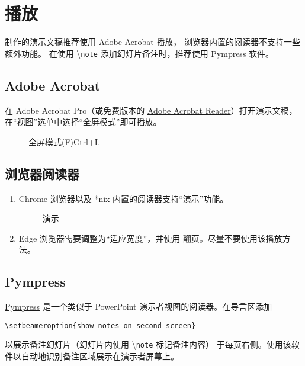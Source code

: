 \documentclass[
    UTF8,
    heading=true,
    12pt,
    a4paper
]{ctexrep}
\newcommand{\cmd}[1]{\textbackslash{}\texttt{#1}}
\begin{document}
\chapter{播放}

制作的演示文稿推荐使用 Adobe Acrobat 播放，
浏览器内置的阅读器不支持一些额外功能。
在使用 \cmd{note} 添加幻灯片备注时，推荐使用 Pympress 软件。

\section{Adobe Acrobat}

在 Adobe Acrobat Pro（或免费版本的
\href{https://www.adobe.com/cn/acrobat/pdf-reader.html}{Adobe Acrobat
Reader}）打开演示文稿，在“视图”选单中选择“全屏模式”即可播放。

\begin{figure}[h]
  \centering
  \begin{tcolorbox}[enhanced, title={视图(V)},
    attach boxed title to top left, boxed title
    style={sharp corners}, sharp corners, tile,
    width=6cm]
    \faTv{} 全屏模式(F)\hfill Ctrl+L
  \end{tcolorbox}
\end{figure}

\section{浏览器阅读器}

\begin{enumerate}
  \item[\faChrome] Chrome 浏览器以及 *nix
        内置的阅读器支持“演示”功能。
        \begin{figure}[h]
          \centering
          \begin{tcolorbox}[enhanced,
              title={$\vdots$}, attach boxed
              title to top
              right, boxed title style={
                  circular arc, top=0mm,
                  bottom=2mm,
                  left=3.25mm, right=3.25mm
                },
              sharp corners, tile, width=6cm]
            演示
          \end{tcolorbox}
        \end{figure}
  \item[\faInternetExplorer] Edge
        浏览器需要调整为“适应宽度”\fbox{\faArrowsAltH}，并使用
         翻页。尽量不要使用该播放方法。
\end{enumerate}

\section{Pympress}
\href{https://github.com/Cimbali/pympress}{Pympress}
是一个类似于 PowerPoint 演示者视图的阅读器。在导言区添加
\begin{verbatim}
\setbeameroption{show notes on second screen}
\end{verbatim}
以展示备注幻灯片（幻灯片内使用 \cmd{note} 标记备注内容）
于每页右侧。使用该软件以自动地识别备注区域展示在演示者屏幕上。
\end{document}
